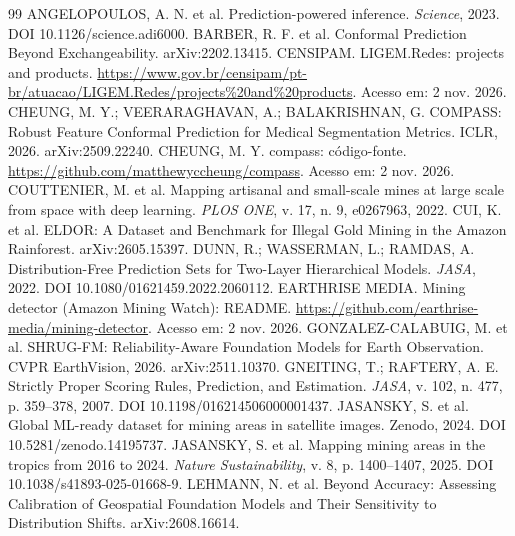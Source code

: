 \documentclass[11pt,a4paper]{article}
\begin{document}
\begin{thebibliography}{99}\small
{} ANGELOPOULOS, A. N. et al. Prediction-powered inference.
  \emph{Science}, 2023. DOI 10.1126/science.adi6000.
 BARBER, R. F. et al. Conformal Prediction Beyond Exchangeability.
  arXiv:2202.13415.
 CENSIPAM. LIGEM.Redes: projects and products.
  \url{https://www.gov.br/censipam/pt-br/atuacao/LIGEM.Redes/projects%20and%20products}. Acesso em: 2 nov. 2026.
 CHEUNG, M. Y.; VEERARAGHAVAN, A.; BALAKRISHNAN, G. COMPASS: Robust Feature
  Conformal Prediction for Medical Segmentation Metrics. ICLR, 2026. arXiv:2509.22240.
 CHEUNG, M. Y. compass: código-fonte. \url{https://github.com/matthewyccheung/compass}.
  Acesso em: 2 nov. 2026.
 COUTTENIER, M. et al. Mapping artisanal and small-scale mines at large
  scale from space with deep learning. \emph{PLOS ONE}, v. 17, n. 9, e0267963, 2022.
 CUI, K. et al. ELDOR: A Dataset and Benchmark for Illegal Gold Mining in the Amazon
  Rainforest. arXiv:2605.15397.
 DUNN, R.; WASSERMAN, L.; RAMDAS, A. Distribution-Free Prediction Sets for Two-Layer
  Hierarchical Models. \emph{JASA}, 2022. DOI 10.1080/01621459.2022.2060112.
 EARTHRISE MEDIA. Mining detector (Amazon Mining Watch): README.
  \url{https://github.com/earthrise-media/mining-detector}. Acesso em: 2 nov. 2026.
 GONZALEZ-CALABUIG, M. et al. SHRUG-FM: Reliability-Aware Foundation
  Models for Earth Observation. CVPR EarthVision, 2026. arXiv:2511.10370.
 GNEITING, T.; RAFTERY, A. E. Strictly Proper Scoring Rules, Prediction, and
  Estimation. \emph{JASA}, v. 102, n. 477, p. 359--378, 2007. DOI 10.1198/016214506000001437.
 JASANSKY, S. et al. Global ML-ready dataset for mining areas in satellite
  images. Zenodo, 2024. DOI 10.5281/zenodo.14195737.
 JASANSKY, S. et al. Mapping mining areas in the tropics from 2016 to 2024.
  \emph{Nature Sustainability}, v. 8, p. 1400--1407, 2025. DOI 10.1038/s41893-025-01668-9.
 LEHMANN, N. et al. Beyond Accuracy: Assessing Calibration of Geospatial
  Foundation Models and Their Sensitivity to Distribution Shifts. arXiv:2608.16614.

\end{thebibliography}
\end{document}
